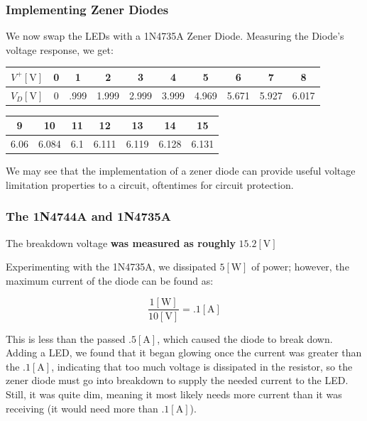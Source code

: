 \documentclass[
	letterpaper, %
	10pt, %
]{CSUniSchoolLabReport}
\begin{document}
    \subsubsection{Implementing Zener Diodes}

    We now swap the LEDs with a 1N4735A Zener Diode. Measuring the Diode's voltage response, we get:

    \begin{center}
    \begin{tabular}[H]{|c|c|c|c|c|c|c|c|c|c|}
      \hline
      $V^{+}[\si{\volt}]$ & 0 & 1 & 2 & 3 & 4 & 5 & 6 & 7 & 8 \\
      \hline
      $V_D[\si{\volt}]$ & 0 & .999 & 1.999 & 2.999 & 3.999 & 4.969 & 5.671 & 5.927 & 6.017\\
      \hline
    \end{tabular}
    \begin{tabular}[H]{|c|c|c|c|c|c|c|}
      \hline
      9 & 10 & 11 & 12 & 13 & 14 & 15\\
      \hline
      6.06 & 6.084 & 6.1 & 6.111 & 6.119 & 6.128 & 6.131\\
      \hline
    \end{tabular}
  \end{center}

  We may see that the implementation of a zener diode can provide useful voltage limitation properties to a circuit, oftentimes for circuit protection. 

  \subsubsection{The 1N4744A and 1N4735A}

  The breakdown voltage \textbf{was measured as roughly} $15.2[\si{\volt}]$

  Experimenting with the 1N4735A, we dissipated $5[\si{\watt}]$ of power; however, the maximum current of the diode can be found as:

  $$\frac{1[\si{\watt}]}{10[\si{\volt}]}=.1[\si{\ampere}]$$

  This is less than the passed $.5[\si{\ampere}]$, which caused the diode to break down. Adding a LED, we found that it began glowing once the current was greater than the $.1[\si{\ampere}]$, indicating that too much voltage is dissipated in the resistor, so the zener diode must go into breakdown to supply the needed current to the LED. Still, it was quite dim, meaning it most likely needs more current than it was receiving (it would need more than $.1[\si{\ampere}]$).
\end{document}
